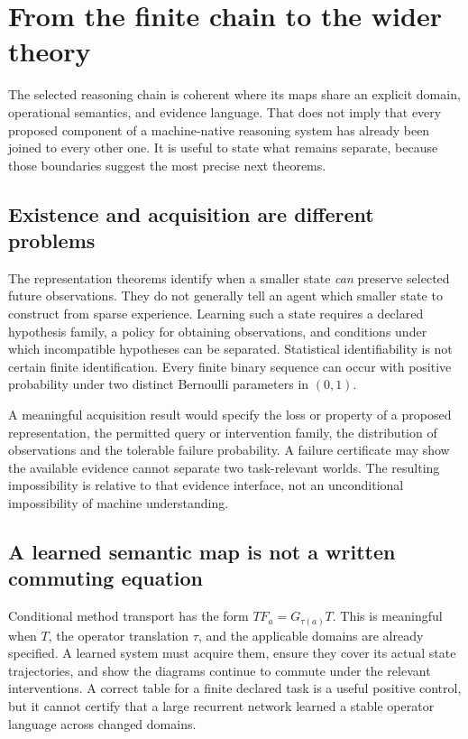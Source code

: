 \chapter{From the finite chain to the wider theory}\label{Core:book:chapter-18}
\label{Core:ch:frontier}

The selected reasoning chain is coherent where its maps share an explicit domain, operational semantics, and evidence language. That does not imply that every proposed component of a machine-native reasoning system has already been joined to every other one. It is useful to state what remains separate, because those boundaries suggest the most precise next theorems.

\section{Existence and acquisition are different problems}
The representation theorems identify when a smaller state \emph{can} preserve selected future observations. They do not generally tell an agent which smaller state to construct from sparse experience. Learning such a state requires a declared hypothesis family, a policy for obtaining observations, and conditions under which incompatible hypotheses can be separated. Statistical identifiability is not certain finite identification. Every finite binary sequence can occur with positive probability under two distinct Bernoulli parameters in $(0,1)$.

A meaningful acquisition result would specify the loss or property of a proposed representation, the permitted query or intervention family, the distribution of observations and the tolerable failure probability. A failure certificate may show the available evidence cannot separate two task-relevant worlds. The resulting impossibility is relative to that evidence interface, not an unconditional impossibility of machine understanding.

\section{A learned semantic map is not a written commuting equation}
Conditional method transport has the form $TF_a=G_{\tau(a)}T$. This is meaningful when $T$, the operator translation $\tau$, and the applicable domains are already specified. A learned system must acquire them, ensure they cover its actual state trajectories, and show the diagrams continue to commute under the relevant interventions. A correct table for a finite declared task is a useful positive control, but it cannot certify that a large recurrent network learned a stable operator language across changed domains.

